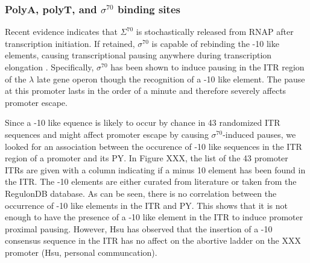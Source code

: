 \documentclass[a4paper]{article}
\begin{document}
\subsubsection{PolyA, polyT, and $\sigma^{70}$ binding sites}

Recent evidence indicates that $\Sigma^{70}$ is stochastically released from
RNAP after transcription initiation. If retained, $\sigma^{70}$ is
capable of rebinding the -10 like elements, causing transcriptional pausing
anywhere during transcription elongation \cite{mooney_tethering_2003}.
Specifically, $\sigma^{70}$ has been shown to induce pausing in the ITR region
of the $\lambda$ late gene operon \cite{ring_function_1996} though the
recognition of a -10 like element. The pause at this promoter lasts in the order
of a minute and therefore severely affects promoter escape.

Since a -10 like equence is likely to occur by chance in 43 randomized ITR
sequences and might affect promoter escape by causing $\sigma^{70}$-induced
pauses, we looked for an association between the occurence of -10 like sequences
in the ITR region of a promoter and its PY. In Figure XXX, the list of the 43
promoter ITRs are given with a column indicating if a minus 10 element has been
found in the ITR.  The -10 elements are either curated from literature or taken
from the RegulonDB database. As can be seen, there is no correlation between the
occurrence of -10 like elements in the ITR and PY. This shows that it is not
enough to have the presence of a -10 like element in the ITR to induce promoter
proximal pausing. However, Hsu has observed that the insertion of a -10
consensus sequence in the ITR has no affect on the abortive ladder on the XXX
promoter (Hsu, personal communcation).
\end{document}

